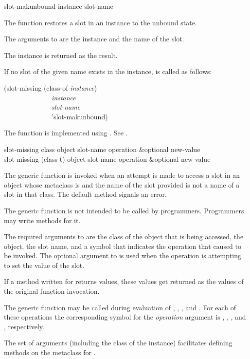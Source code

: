 \begin{defun}[Function]
slot-makunbound instance slot-name

The function  restores a slot in an instance to
the unbound state.





The arguments to  are the instance and the name of
the slot.


The instance is returned as the result.


If no slot of the given name exists in the instance, 
is called as follows:
\begin{lisp}
(slot-missing (class-of \emph{instance\/}) \\
~~~~~~~~~~~~~~\emph{instance\/} \\
~~~~~~~~~~~~~~\emph{slot-name\/} \\
~~~~~~~~~~~~~~'slot-makunbound)
\end{lisp}

The function  is implemented using 
.
See .
\end{defun}



\begin{defun}
slot-missing class object slot-name operation &optional new-value \\
slot-missing (class t) object slot-name operation &optional new-value

The generic function  is invoked when an attempt is
made to access a slot in an object whose metaclass is 
 and the name of the slot provided is not a name of a
slot in that class.  
The default method signals an error.

The generic function  is not intended to be called by
programmers.  Programmers may write methods for it.





The required arguments to  are the class of the object
that is being accessed, the object, the slot name, and a symbol that
indicates the operation that caused   to be invoked.
The optional argument to  is used when the operation
is attempting to set the value of the slot.


If a method written for  returns values, these
values get returned as the values of the original function invocation.


The generic function  may be called during
evaluation of , , 
, and .  For each
of these operations the corresponding symbol for the \emph{operation\/}
argument is , , , and 
, respectively.

The set of arguments (including the class of the instance) facilitates
defining methods on the metaclass for .

\end{defun}


